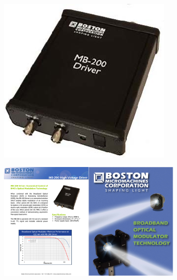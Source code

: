 \begin{figure}[!htbp]
\begin{subfigure}[c]{0.3\textwidth}
		\caption{}
		\label{fig:boston-MEMS-MRR-outer.jpg}
	\end{subfigure}
	\begin{subfigure}[c]{0.3\textwidth}
		\includegraphics[width=\textwidth]{./Img/boston-MEMS-MRR-driver.jpg}
		\caption{}
		\label{fig:boston-MEMS-MRR-driver.jpg}
	\end{subfigure}
	\begin{subfigure}[c]{1\textwidth}
	\includegraphics[width=\textwidth]{./Img/MB-200-frequency.pdf}
	\caption{}
	\label{fig:MB-200-frequency.pdf}
\end{subfigure}
	\label{fig:MEMS-MRR-FIGURE}
\end{figure}

